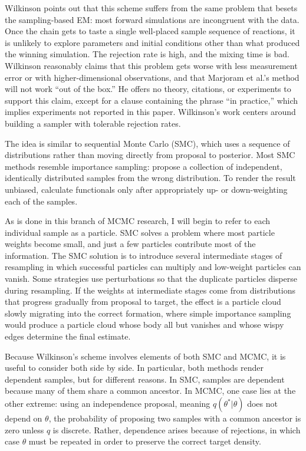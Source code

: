 \documentclass{article}
\begin{document}
Wilkinson points out that this scheme suffers from the same problem that besets the sampling-based EM: most forward simulations are incongruent with the data. Once the chain gets to taste a single well-placed sample sequence of reactions, it is unlikely to explore parameters and initial conditions other than what produced the winning simulation. The rejection rate is high, and the mixing time is bad. Wilkinson reasonably claims that this problem gets worse with less measurement error or with higher-dimensional observations, and that Marjoram et al.'s method will not work ``out of the box.'' He offers no theory, citations, or experiments to support this claim, except for a clause containing the phrase ``in practice,'' which implies experiments not reported in this paper. Wilkinson's work centers around building a sampler with tolerable rejection rates. 

The idea is similar to sequential Monte Carlo (SMC), which uses a sequence of distributions rather than moving directly from proposal to posterior. Most SMC methods resemble importance sampling: propose a collection of independent, identically distributed samples from the wrong distribution. To render the result unbiased, calculate functionals only after appropriately up- or down-weighting each of the samples. 

As is done in this branch of MCMC research, I will begin to refer to each individual sample as a particle. SMC solves a problem where most particle weights become small, and just a few particles contribute most of the information. The SMC solution is to introduce several intermediate stages of resampling in which successful particles can multiply and low-weight particles can vanish. Some strategies use perturbations so that the duplicate particles disperse during resampling. If the weights at intermediate stages come from distributions that progress gradually from proposal to target, the effect is a particle cloud slowly migrating into the correct formation, where simple importance sampling would produce a particle cloud whose body all but vanishes and whose wispy edges determine the final estimate. 

Because Wilkinson's scheme involves elements of both SMC and MCMC, it is useful to consider both side by side. In particular, both methods render dependent samples, but for different reasons. In SMC, samples are dependent because many of them share a common ancestor. In MCMC, one case lies at the other extreme: using an independence proposal, meaning $q(\theta^*|\theta)$ does not depend on $\theta$, the probability of proposing two samples with a common ancestor is zero unless $q$ is discrete. Rather, dependence arises because of rejections, in which case $\theta$ must be repeated in order to preserve the correct target density.
\end{document}
